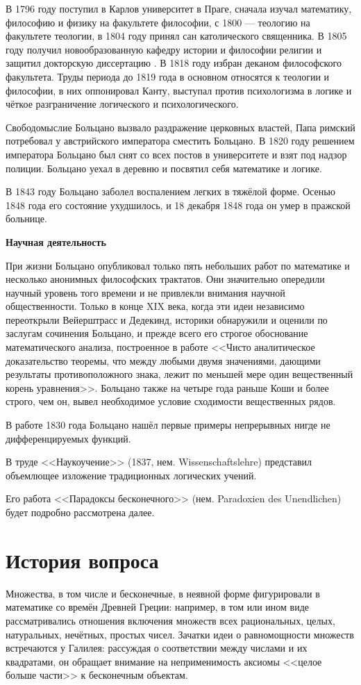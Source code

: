 \documentclass[12pt]{extarticle}
\begin{document}
В 1796 году поступил в Карлов университет в Праге, сначала изучал математику, философию и физику на факультете философии, с 1800 — теологию на факультете теологии, в 1804 году принял сан католического священника. В 1805 году получил новообразованную кафедру истории и философии религии и защитил докторскую диссертацию . В 1818 году избран деканом философского факультета. Труды периода до 1819 года в основном относятся к теологии и философии, в них оппонировал Канту, выступал против психологизма в логике и чёткое разграничение логического и психологического.

Свободомыслие Больцано вызвало раздражение церковных властей, Папа римский потребовал у австрийского императора сместить Больцано. В 1820 году решением императора Больцано был снят со всех постов в университете и взят под надзор полиции. Больцано уехал в деревню и посвятил себя математике и логике.

В 1843 году Больцано заболел воспалением легких в тяжёлой форме. Осенью 1848 года его состояние ухудшилось, и 18 декабря 1848 года он умер в пражской больнице. 
\begin{center}
\bfseries Научная деятельность 
\end{center}


При жизни Больцано опубликовал только пять небольших работ по математике и несколько анонимных философских трактатов. Они значительно опередили научный уровень того времени и не привлекли внимания научной общественности. Только в конце XIX века, когда эти идеи независимо переоткрыли Вейерштрасс и Дедекинд, историки обнаружили и оценили по заслугам сочинения Больцано, и прежде всего его строгое обоснование математического анализа, построенное в работе <<Чисто аналитическое доказательство теоремы, что между любыми двумя значениями, дающими результаты противоположного знака, лежит по меньшей мере один вещественный корень уравнения>>. Больцано также на четыре года раньше Коши и более строго, чем он, вывел необходимое условие сходимости вещественных рядов.

В работе 1830 года Больцано нашёл первые примеры непрерывных нигде не дифференцируемых функций.

В труде <<Наукоучение>> (1837, нем. Wissenschaftslehre) представил объемлющее изложение традиционных логических учений.

Его работа <<Парадоксы бесконечного>> (нем. Paradoxien des Unendlichen) будет подробно рассмотрена далее.

\section{История вопроса}
Множества, в том числе и бесконечные, в неявной форме фигурировали в математике со времён Древней Греции: например, в том или ином виде рассматривались отношения включения множеств всех рациональных, целых, натуральных, нечётных, простых чисел. Зачатки идеи о равномощности множеств встречаются у Галилея: рассуждая о соответствии между числами и их квадратами, он обращает внимание на неприменимость аксиомы <<целое больше части>> к бесконечным объектам.
\end{document}

